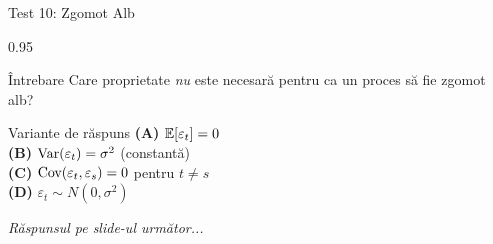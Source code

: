 \documentclass[9pt, aspectratio=169, t]{beamer}
\begin{document}
\begin{frame}{Test 10: Zgomot Alb}
    \begin{cminipage}{0.95\textwidth}
    \begin{alertblock}{Întrebare}
        Care proprietate \emph{nu} este necesară pentru ca un proces să fie zgomot alb?
    \end{alertblock}

    \vspace{0.4cm}

    \begin{block}{Variante de răspuns}
    \textcolor{MainBlue}{\textbf{(A)}} $\mathbb{E}[\varepsilon_t] = 0$\\[3pt]
    \textcolor{MainBlue}{\textbf{(B)}} $\text{Var}(\varepsilon_t) = \sigma^2$ (constantă)\\[3pt]
    \textcolor{MainBlue}{\textbf{(C)}} $\text{Cov}(\varepsilon_t, \varepsilon_s) = 0$ pentru $t \neq s$\\[3pt]
    \textcolor{MainBlue}{\textbf{(D)}} $\varepsilon_t \sim N(0, \sigma^2)$
    \end{block}
    \vspace{0.5cm}

    \begin{center}
        \textit{Răspunsul pe slide-ul următor...}
    \end{center}
    \end{cminipage}
\end{frame}
\end{document}

